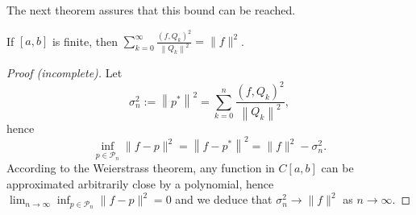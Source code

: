 \documentclass[a4paper]{article}
\begin{document}
The next theorem assures that this bound can be reached.

\begin{theorem}
    If $[a, b]$ is finite, then $ \displaystyle \sum_{k=0}^{\infty} \frac{\left(f, Q_k\right)^2}{\left\|Q_k\right\|^2}=\|f\|^2$.
\end{theorem}
\begin{proof}[Proof (incomplete)]
    Let
    \[
    \sigma_n^2:=\left\|p^*\right\|^2=\sum_{k=0}^n \frac{\left(f, Q_k\right)^2}{\left\|Q_k\right\|^2},
    \]
    hence
    \[
    \inf_{p \in \mathcal{P}_n}\|f-p\|^2=\left\|f-p^*\right\|^2=\|f\|^2-\sigma_n^2 .
    \]
    According to the Weierstrass theorem, any function in $C[a, b]$ can be approximated arbitrarily close by a polynomial, hence $\lim _{n \rightarrow \infty} \inf _{p \in \mathcal{P}_n}\|f-p\|^2=0$ and we deduce that $\sigma_n^2 \rightarrow\|f\|^2$ as $n \rightarrow \infty$.
\end{proof}
\end{document}
